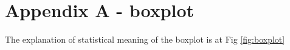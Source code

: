 \chapter{Appendix A - boxplot}

The explanation of statistical meaning of the boxplot is at Fig \ref{fig:boxplot}
\label{AppendixA}


